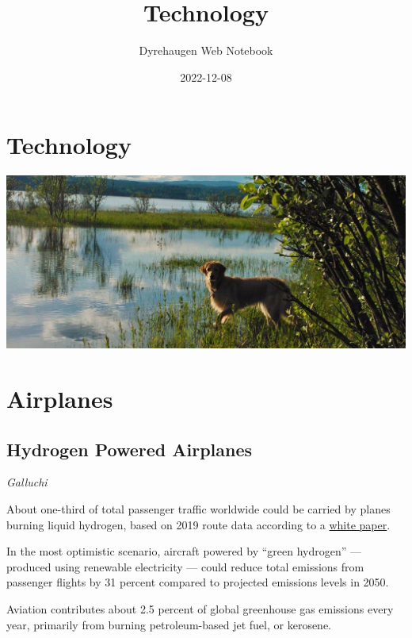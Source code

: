 \documentclass[
]{book}
\title{Technology}
\author{Dyrehaugen Web Notebook}
\date{2022-12-08}
\begin{document}
\maketitle

{
\setcounter{tocdepth}{1}
\tableofcontents
}
\hypertarget{technology}{%
\chapter{Technology}\label{technology}}

\includegraphics{fig/zelda.jpg}

\hypertarget{airplanes}{%
\chapter{Airplanes}\label{airplanes}}

\hypertarget{hydrogen-powered-airplanes}{%
\section{Hydrogen Powered Airplanes}\label{hydrogen-powered-airplanes}}

\emph{Galluchi}

About one-third of total passenger traffic worldwide could be carried by planes burning liquid hydrogen, based on 2019 route data according to a \href{https://theicct.org/publication/aviation-global-evo-hydrogen-aircraft-jan22}{white paper}.

In the most optimistic scenario, aircraft powered by \hspace{0pt}``green hydrogen'' --- produced using renewable electricity --- could reduce total emissions from passenger flights by 31 percent compared to projected emissions levels in 2050.

Aviation contributes about 2.5 percent of global greenhouse gas emissions every year, primarily from burning petroleum-based jet fuel, or kerosene.
\end{document}
